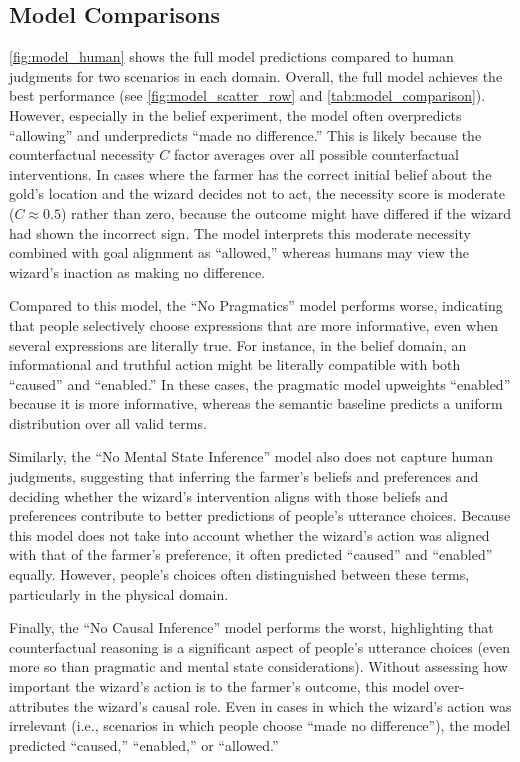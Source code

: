 \documentclass[10pt,letterpaper]{article}
\begin{document}
\subsection{Model Comparisons}
\autoref{fig:model_human} shows the full model predictions compared to human judgments for two scenarios in each domain. Overall, the full model achieves the best performance (see \autoref{fig:model_scatter_row} and \autoref{tab:model_comparison}).
However, especially in the belief experiment, the model often overpredicts ``allowing'' and underpredicts ``made no difference.'' 
This is likely because the counterfactual necessity $C$ factor averages over all possible counterfactual interventions.
In cases where the farmer has the correct initial belief about the gold's location and the wizard decides not to act, the necessity score is moderate ($C \approx 0.5$) rather than zero, because the outcome might have differed if the wizard had shown the incorrect sign.
The model interprets this moderate necessity combined with goal alignment as ``allowed,'' whereas humans may view the wizard's inaction as making no difference.

Compared to this model, the ``No Pragmatics'' model performs worse, indicating that people selectively choose expressions that are more informative, even when several expressions are literally true.
For instance, in the belief domain, an informational and truthful action might be literally compatible with both ``caused'' and ``enabled.''
In these cases, the pragmatic model upweights ``enabled'' because it is more informative, whereas the semantic baseline predicts a uniform distribution over all valid terms.

Similarly, the ``No Mental State Inference'' model also does not capture human judgments, suggesting that inferring the farmer's beliefs and preferences and deciding whether the wizard's intervention aligns with those beliefs and preferences contribute to better predictions of people's utterance choices.
Because this model does not take into account whether the wizard's action was aligned with that of the farmer's preference, it often predicted ``caused'' and ``enabled'' equally.
However, people's choices often distinguished between these terms, particularly in the physical domain.

Finally, the ``No Causal Inference'' model performs the worst, highlighting that counterfactual reasoning is a significant aspect of people's utterance choices 
(even more so than pragmatic and mental state considerations).
Without assessing how important the wizard's action is to the farmer's outcome, this model over-attributes the wizard's causal role. 
Even in cases in which the wizard's action was irrelevant (i.e., scenarios in which people choose ``made no difference''), the model predicted ``caused,'' ``enabled,'' or ``allowed.''
\end{document}
